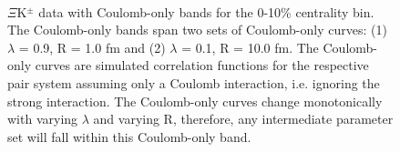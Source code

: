 \documentclass[/home/jesse/Analysis/FemtoAnalysis/AnalysisNotes/AnalysisNoteJBuxton.tex]{subfiles}
\begin{document}
\begin{figure}[h]
  \centering
  \\
  \caption[$\Xi$K$^{\pm}$ Data with Coulomb-Only Bands, 0-10\% Centrality]{$\Xi$K$^{\pm}$ data with Coulomb-only bands for the 0-10\% centrality bin.  The Coulomb-only bands span two sets of Coulomb-only curves: (1) $\lambda$ = 0.9, R = 1.0 fm and (2) $\lambda$ = 0.1, R = 10.0 fm.  The Coulomb-only curves are simulated correlation functions for the respective pair system assuming only a Coulomb interaction, i.e. ignoring the strong interaction.  The Coulomb-only curves change monotonically with varying $\lambda$ and varying R, therefore, any intermediate parameter set will fall within this Coulomb-only band.}
  \label{fig:XiKchCoulombOnlyBand}
\end{figure}
\end{document}
